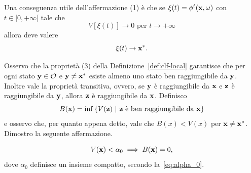 \begin{steps}
    Una conseguenza utile dell'affermazione (1) è che se
    $\xi(t) = \phi^t(\mathbf{x}, \omega)$ con $t \in [0, +\infty[$ tale che
    \begin{equation*}
        V[\xi(t)] \to 0 \text{ per } t \to +\infty
    \end{equation*}
    allora deve valere
    \begin{equation}
        \xi(t) \to \mathbf{x}^*.
        \label{eq:xi-to-xstar}
    \end{equation}


    \item Osservo che la proprietà (3) della Definizione~\ref{def:clf-local}
    garantisce che per ogni stato $\mathbf{y} \in \mathcal O$ e $\mathbf{y} \neq \mathbf{x}^*$ esiste
    almeno uno stato ben raggiungibile da $\mathbf{y}$.
    Inoltre vale la proprietà transitiva, ovvero, se $\mathbf{y}$ è raggiungibile da $\mathbf{x}$
    e $\mathbf{z}$ è raggiungibile da $\mathbf{y}$, allora $\mathbf{z}$ è raggiungibile da $\mathbf{x}$.
    Definisco
    \begin{equation*}
        B(\mathbf{x}) = \inf\left\{ V(\mathbf{z})\ |\ \mathbf{z} \text{ è ben raggiungibile da } \mathbf{x} \right\}
    \end{equation*}
    e osservo che, per quanto appena detto, vale che $B(x) < V(x)$ per $\mathbf{x} \neq \mathbf{x}^*$.
    Dimostro la seguente affermazione.

    \begin{aff}
        \begin{equation*}
            V(\mathbf{x}) < \alpha_0 \implies B(\mathbf{x}) = 0,
        \end{equation*}
        dove $\alpha_0$ definisce un insieme compatto, secondo la~\eqref{eq:alpha_0}.
    \end{aff}


\end{steps}
